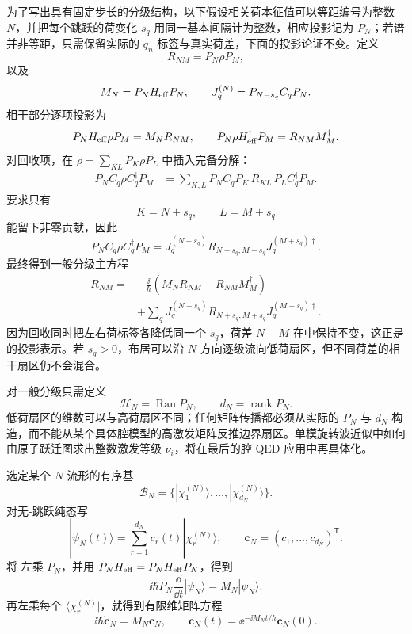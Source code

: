 为了写出具有固定步长的分级结构，以下假设相关荷本征值可以等距编号为整数 $N$，并把每个跳跃的荷变化 $s_q$ 用同一基本间隔计为整数，相应投影记为 $P_N$；若谱并非等距，只需保留实际的 $q_n$ 标签与真实荷差，下面的投影论证不变。定义
\begin{equation}
R_{NM}=P_N\rho P_M,
\label{eq:phys-oqs-density-block-general}
\end{equation}
以及
\begin{equation}
M_N=P_NH_{\rm eff}P_N,
\qquad
J_q^{(N)}=P_{N-s_q}C_qP_N.
\label{eq:phys-oqs-general-block-operators}
\end{equation}
相干部分逐项投影为
\[
P_NH_{\rm eff}\rho P_M=M_NR_{NM},
\qquad
P_N\rho H_{\rm eff}^\dagger P_M=R_{NM}M_M^\dagger.
\]
对回收项，在 $\rho=\sum_{KL}P_K\rho P_L$ 中插入完备分解：
\begin{align}
P_NC_q\rho C_q^\dagger P_M
&=\sum_{K,L}P_NC_qP_K\,R_{KL}\,P_LC_q^\dagger P_M.
\end{align}
 要求只有
\[
K=N+s_q,
\qquad
L=M+s_q
\]
能留下非零贡献，因此
\[
P_NC_q\rho C_q^\dagger P_M
=J_q^{(N+s_q)}R_{N+s_q,M+s_q}J_q^{(M+s_q)\dagger}.
\]
最终得到一般分级主方程
\begin{equation}
\begin{aligned}
\dot R_{NM}
={}&-\frac{\ii}{\hbar}
(M_NR_{NM}-R_{NM}M_M^\dagger)\\
&+\sum_q
J_q^{(N+s_q)}R_{N+s_q,M+s_q}
J_q^{(M+s_q)\dagger}.
\end{aligned}
\label{eq:phys-oqs-general-block-master}
\end{equation}
因为回收同时把左右荷标签各降低同一个 $s_q$，荷差 $N-M$ 在中保持不变，这正是的投影表示。若 $s_q>0$，布居可以沿 $N$ 方向逐级流向低荷扇区，但不同荷差的相干扇区仍不会混合。

对一般分级只需定义
\[
\mathcal H_N=\operatorname{Ran}P_N,
\qquad
d_N=\operatorname{rank}P_N.
\]
低荷扇区的维数可以与高荷扇区不同；任何矩阵传播都必须从实际的 $P_N$ 与 $d_N$ 构造，而不能从某个具体腔模型的高激发矩阵反推边界扇区。单模旋转波近似中如何由原子跃迁图求出整数激发等级 $\nu_i$，将在最后的腔 QED 应用中再具体化。

选定某个 $N$ 流形的有序基
\[
\mathcal B_N=
\{|\chi_1^{(N)}\rangle,\ldots,|\chi_{d_N}^{(N)}\rangle\}.
\]
对无-跳跃纯态写
\[
|\psi_N(t)\rangle
=\sum_{r=1}^{d_N}c_r(t)|\chi_r^{(N)}\rangle,
\qquad
\mathbf c_N=(c_1,\ldots,c_{d_N})^{\mathsf T}.
\]
将 左乘 $P_N$，并用 $P_NH_{\rm eff}=P_NH_{\rm eff}P_N$，得到
\[
\ii\hbar P_N\frac{\dd}{\dd t}|\psi_N\rangle
=M_N|\psi_N\rangle.
\]
再左乘每个 $\langle\chi_r^{(N)}|$，就得到有限维矩阵方程
\begin{equation}
\ii\hbar\dot{\mathbf c}_N=M_N\mathbf c_N,
\qquad
\mathbf c_N(t)=\ee^{-\ii M_Nt/\hbar}\mathbf c_N(0).
\label{eq:phys-oqs-manifold-propagator}
\end{equation}

